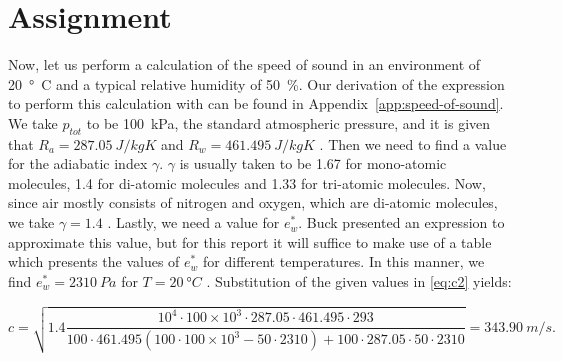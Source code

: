 \documentclass[11pt,titlepage]{report}
\begin{document}
\section{Assignment}
Now, let us perform a calculation of the speed of sound in an environment of \SI{20}{\degree C} and a typical relative humidity of \SI{50}{\%}. Our derivation of the expression to perform this calculation with can be found in Appendix~\ref{app:speed-of-sound}. We take $p_{tot}$ to be \SI{100}{kPa}, the standard atmospheric pressure, and it is given that $R_a = \SI{287.05}{J/kgK}$ and $R_w = \SI{461.495}{J/kgK}$ \cite{sengpiel-sound-speed}. Then we need to find a value for the adiabatic index $\gamma$. $\gamma$ is usually taken to be \num{1.67} for mono-atomic molecules, \num{1.4} for di-atomic molecules and \num{1.33} for tri-atomic molecules. Now, since air mostly consists of nitrogen and oxygen, which are di-atomic molecules, we take $\gamma = 1.4$ \cite{eng-tb-air-comp}. Lastly, we need a value for $e^*_w$. Buck \cite{buck-sat-press} presented an expression to approximate this value, but for this report it will suffice to make use of a table which presents the values of $e^*_w$ for different temperatures. In this manner, we find $e^*_w = \SI{2310}{Pa}$ for $T = \SI{20}{\degree C}$ \cite{eng-tb-sat-press}.
Substitution of the given values in \ref{eq:c2} yields:

\begin{equation}
	c = \sqrt{1.4 \frac{10^4 \cdot 100 \times 10^3 \cdot 287.05 \cdot 461.495 \cdot 293}{100 \cdot 461.495(100 \cdot 100 \times 10^3 - 50 \cdot 2310) + 100 \cdot 287.05 \cdot 50 \cdot 2310}} = \SI{343.90}{m/s}.
\end{equation}
\end{document}
